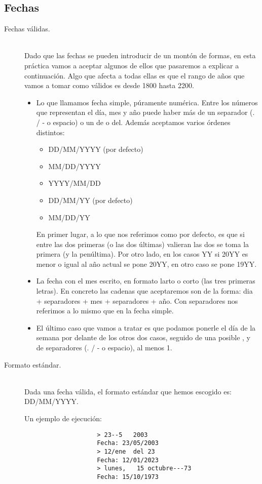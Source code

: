 \documentclass[12pt]{article}
\begin{document}
    \subsection{Fechas}
    \begin{description}
        \item [Fechas válidas.]~\\
            Dado que las fechas se pueden introducir de un montón de formas, en esta práctica vamos a aceptar algunos de ellos que pasaremos a explicar a continuación. Algo que afecta a todas ellas es que el rango de años que vamos a tomar como válidos es desde 1800 hasta 2200.
            \begin{itemize}
                \item Lo que llamamos fecha simple, púramente numérica. Entre los números que representan el día, mes y año puede haber más de un separador (. / - o espacio) o un de o del. Además aceptamos varios órdenes distintos:
                    \begin{itemize}
                        \item DD/MM/YYYY (por defecto)
                        \item MM/DD/YYYY
                        \item YYYY/MM/DD
                        \item DD/MM/YY (por defecto)
                        \item MM/DD/YY
                    \end{itemize}
                    En primer lugar, a lo que nos referimos como por defecto, es que si entre las dos primeras (o las dos últimas) valieran las dos se toma la primera (y la penúltima). Por otro lado, en los casos YY si 20YY es menor o igual al año actual se pone 20YY, en otro caso se pone 19YY. 

                \item La fecha con el mes escrito, en formato larto o corto (las tres primeras letras). En concreto las cadenas que aceptaremos son de la forma: dia + separadores + mes + separadores + año. Con separadores nos referimos a lo mismo que en la fecha simple.
                \item El último caso que vamos a tratar es que podamos ponerle el día de la semana por delante de los otros dos casos, seguido de una posible , y de separadores (. / - o espacio), al menos 1.  
            \end{itemize}
        \item [Formato estándar.]~\\
            Dada una fecha válida, el formato estándar que hemos escogido es: DD/MM/YYYY\@.
            \begin{ejemplo}
                Un ejemplo de ejecución:
                \begin{verbatim}
                    > 23--5   2003
                    Fecha: 23/05/2003
                    > 12/ene  del 23
                    Fecha: 12/01/2023
                    > lunes,   15 octubre---73
                    Fecha: 15/10/1973
                \end{verbatim}


\end{ejemplo}
\end{description}
\end{document}

